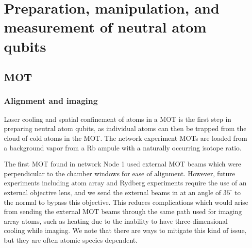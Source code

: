 \chapter{Preparation, manipulation, and measurement of neutral atom qubits}\label{ch:qubit_prep}

\section{MOT}
\subsection{Alignment and imaging}

Laser cooling and spatial confinement of atoms in a MOT is the first step in preparing neutral atom qubits, as individual atoms can then be trapped from the cloud of cold atoms in the MOT. The network experiment MOTs are loaded from a background vapor from a Rb ampule with a naturally occurring isotope ratio.

The first MOT found in network Node 1 used external MOT beams which were perpendicular to the chamber windows for ease of alignment. However, future experiments including atom array and Rydberg experiments require the use of an external objective lens, and we
send the external beams in at an angle of $35^{\circ}$ to the normal to bypass this objective. This reduces complications which would arise from sending the external MOT beams through the same path used for imaging array atoms, such as heating due to the inability to have three-dimensional cooling while imaging. We note that there are ways to mitigate this kind of issue, but they are often atomic species dependent\cite{covey20192000}.

